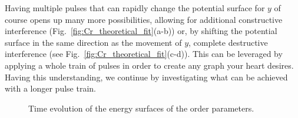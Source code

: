 Having multiple pulses that can rapidly change the potential surface for $y$ of course opens up many more possibilities, allowing for additional constructive interference (Fig.~\ref{fig:Cr_theoretical_fit}(a-b)) or, by shifting the potential surface in the same direction as the movement of $y$, complete destructive interference (see Fig.~\ref{fig:Cr_theoretical_fit}(c-d)).
This can be leveraged by applying a whole train of pulses in order to create any graph your heart desires.
Having this understanding, we continue by investigating what can be achieved with a longer pulse train.
\begin{figure}
	\begin{subfigure}{0.5\textwidth}
	\end{subfigure}
	\begin{subfigure}{0.5\textwidth}
	\end{subfigure}
	\caption{\label{fig:Cr_energy_surfaces} Time evolution of the energy surfaces of the order parameters.}
\end{figure}

